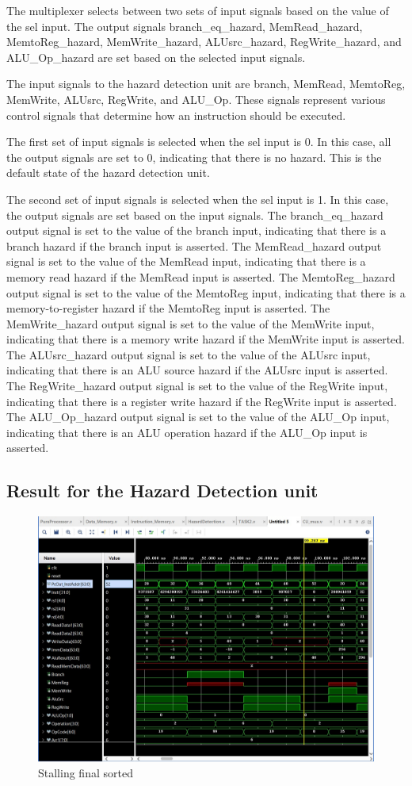 \documentclass{article}
\begin{document}
The multiplexer selects between two sets of input signals based on the value of the sel input. The output signals branch\_eq\_hazard, MemRead\_hazard, MemtoReg\_hazard, MemWrite\_hazard, ALUsrc\_hazard, RegWrite\_hazard, and ALU\_Op\_hazard are set based on the selected input signals.

The input signals to the hazard detection unit are branch, MemRead, MemtoReg, MemWrite, ALUsrc, RegWrite, and ALU\_Op. These signals represent various control signals that determine how an instruction should be executed.

The first set of input signals is selected when the sel input is 0. In this case, all the output signals are set to 0, indicating that there is no hazard. This is the default state of the hazard detection unit.

The second set of input signals is selected when the sel input is 1. In this case, the output signals are set based on the input signals. The branch\_eq\_hazard output signal is set to the value of the branch input, indicating that there is a branch hazard if the branch input is asserted. The MemRead\_hazard output signal is set to the value of the MemRead input, indicating that there is a memory read hazard if the MemRead input is asserted. The MemtoReg\_hazard output signal is set to the value of the MemtoReg input, indicating that there is a memory-to-register hazard if the MemtoReg input is asserted. The MemWrite\_hazard output signal is set to the value of the MemWrite input, indicating that there is a memory write hazard if the MemWrite input is asserted. The ALUsrc\_hazard output signal is set to the value of the ALUsrc input, indicating that there is an ALU source hazard if the ALUsrc input is asserted. The RegWrite\_hazard output signal is set to the value of the RegWrite input, indicating that there is a register write hazard if the RegWrite input is asserted. The ALU\_Op\_hazard output signal is set to the value of the ALU\_Op input, indicating that there is an ALU operation hazard if the ALU\_Op input is asserted.

\subsection{Result for the Hazard Detection unit}

\begin{figure}[!h]
    \centering
    \includegraphics*[width = 9 cm]{stallingfinalsorted.jpeg}
    \caption{Stalling final sorted}
    \label{fig:label6}
\end{figure}
\end{document}
